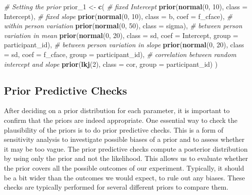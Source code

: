 \documentclass[
  doc,12pt,floatsintext]{apa7}
\newenvironment{Shaded}{\begin{snugshade}}{\end{snugshade}}
\newcommand{\AttributeTok}[1]{\textcolor[rgb]{0.13,0.29,0.53}{#1}}
\newcommand{\CommentTok}[1]{\textcolor[rgb]{0.56,0.35,0.01}{\textit{#1}}}
\newcommand{\DecValTok}[1]{\textcolor[rgb]{0.00,0.00,0.81}{#1}}
\newcommand{\FunctionTok}[1]{\textcolor[rgb]{0.13,0.29,0.53}{\textbf{#1}}}
\newcommand{\NormalTok}[1]{#1}
\newcommand{\OtherTok}[1]{\textcolor[rgb]{0.56,0.35,0.01}{#1}}
\begin{document}
\begin{Shaded}
\begin{Highlighting}[]
\CommentTok{\# Setting the prior}
\NormalTok{prior\_1 }\OtherTok{\textless{}{-}} \FunctionTok{c}\NormalTok{(}
  \CommentTok{\# fixed Intercept}
  \FunctionTok{prior}\NormalTok{(}\FunctionTok{normal}\NormalTok{(}\DecValTok{0}\NormalTok{, }\DecValTok{10}\NormalTok{), }\AttributeTok{class =}\NormalTok{ Intercept), }
  \CommentTok{\# fixed slope}
  \FunctionTok{prior}\NormalTok{(}\FunctionTok{normal}\NormalTok{(}\DecValTok{0}\NormalTok{, }\DecValTok{10}\NormalTok{), }\AttributeTok{class =}\NormalTok{ b, }\AttributeTok{coef =}\NormalTok{ f\_cface), }
  \CommentTok{\# within person variation}
  \FunctionTok{prior}\NormalTok{(}\FunctionTok{normal}\NormalTok{(}\DecValTok{0}\NormalTok{, }\DecValTok{50}\NormalTok{), }\AttributeTok{class =}\NormalTok{ sigma), }
  \CommentTok{\# between person variation in mean}
  \FunctionTok{prior}\NormalTok{(}\FunctionTok{normal}\NormalTok{(}\DecValTok{0}\NormalTok{, }\DecValTok{20}\NormalTok{), }\AttributeTok{class =}\NormalTok{ sd, }\AttributeTok{coef =}\NormalTok{ Intercept, }
        \AttributeTok{group =}\NormalTok{ participant\_id), }
  \CommentTok{\# between person variation in slope}
  \FunctionTok{prior}\NormalTok{(}\FunctionTok{normal}\NormalTok{(}\DecValTok{0}\NormalTok{, }\DecValTok{20}\NormalTok{), }\AttributeTok{class =}\NormalTok{ sd, }\AttributeTok{coef =}\NormalTok{ f\_cface, }
        \AttributeTok{group =}\NormalTok{ participant\_id), }
  \CommentTok{\# correlation between random intercept and slope}
  \FunctionTok{prior}\NormalTok{(}\FunctionTok{lkj}\NormalTok{(}\DecValTok{2}\NormalTok{), }\AttributeTok{class =}\NormalTok{ cor, }\AttributeTok{group =}\NormalTok{ participant\_id)}
\NormalTok{) }
\end{Highlighting}
\end{Shaded}

\subsection{Prior Predictive Checks}\label{prior-predictive-checks}

After deciding on a prior distribution for each parameter, it is important to confirm that the priors are indeed appropriate. One essential way to check the plausibility of the priors is to do prior predictive checks. This is a form of sensitivity analysis to investigate possible biases of a prior and to assess whether it may be too vague. The prior predictive checks compute a posterior distribution by using only the prior and not the likelihood. This allows us to evaluate whether the prior covers all the possible outcomes of our experiment. Typically, it should be a bit wider than the outcomes we would expect, to rule out any biases. These checks are typically performed for several different priors to compare them.
\end{document}
